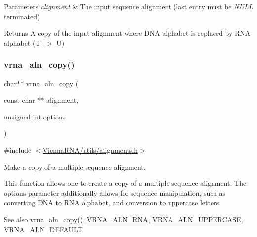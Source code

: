 \begin{DoxyParams}{Parameters}
{\em alignment} & The input sequence alignment (last entry must be {\itshape N\+U\+LL} terminated) \\
\hline
\end{DoxyParams}
\begin{DoxyReturn}{Returns}
A copy of the input alignment where D\+NA alphabet is replaced by R\+NA alphabet (T -\/$>$ U) 
\end{DoxyReturn}
\mbox{\label{group__aln__utils_ga08cdca592461436860daf9738279ce17}} 
\subsubsection{\texorpdfstring{vrna\_aln\_copy()}{vrna\_aln\_copy()}}
{\footnotesize\ttfamily char$\ast$$\ast$ vrna\+\_\+aln\+\_\+copy (\begin{DoxyParamCaption}\item[{const char $\ast$$\ast$}]{alignment,  }\item[{unsigned int}]{options }\end{DoxyParamCaption})}



{\ttfamily \#include $<$\mbox{\hyperlink{utils_2alignments_8h}{Vienna\+R\+N\+A/utils/alignments.\+h}}$>$}



Make a copy of a multiple sequence alignment. 

This function allows one to create a copy of a multiple sequence alignment. The {\ttfamily options} parameter additionally allows for sequence manipulation, such as converting D\+NA to R\+NA alphabet, and conversion to uppercase letters.

\begin{DoxySeeAlso}{See also}
\mbox{\hyperlink{group__aln__utils_ga08cdca592461436860daf9738279ce17}{vrna\+\_\+aln\+\_\+copy()}}, \mbox{\hyperlink{group__aln__utils_ga1a2aa60bcc51dc8e48c07bf146bd28c1}{V\+R\+N\+A\+\_\+\+A\+L\+N\+\_\+\+R\+NA}}, \mbox{\hyperlink{group__aln__utils_ga0de72fc917d72acafe862750a3a5e0bc}{V\+R\+N\+A\+\_\+\+A\+L\+N\+\_\+\+U\+P\+P\+E\+R\+C\+A\+SE}}, \mbox{\hyperlink{group__aln__utils_ga7437bcbc3142b266f1f3b086eb669092}{V\+R\+N\+A\+\_\+\+A\+L\+N\+\_\+\+D\+E\+F\+A\+U\+LT}}
\end{DoxySeeAlso}

